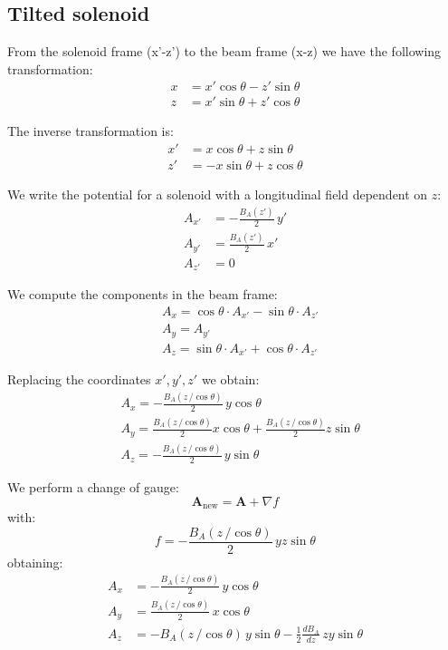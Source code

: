 \subsection{Tilted solenoid}

From the solenoid frame (x'-z') to the beam frame (x-z) we have the following transformation:
\begin{align}
x &= x' \cos\theta - z' \sin\theta \\
z &= x' \sin\theta + z' \cos\theta
\end{align}

The inverse transformation is:
\begin{align}
x' &= x \cos\theta + z \sin\theta \\
z' &= -x \sin\theta + z \cos\theta
\end{align}

We write the potential for a solenoid with a longitudinal field dependent on $z$:
\begin{align}
A_{x'} &= -\frac{B_A(z')}{2} \, y' \\
A_{y'} &= \frac{B_A(z')}{2} \, x' \\
A_{z'} &= 0
\end{align}

We compute the components in the beam frame:
\begin{align}
&A_x = \cos\theta \cdot A_{x'} - \sin\theta \cdot A_{z'} \\
&A_y = A_{y'} \\
&A_z = \sin\theta \cdot A_{x'} + \cos\theta \cdot A_{z'}
\end{align}

Replacing the coordinates $x', y', z'$ we obtain:
\begin{align}
&A_x = -\frac{B_A(z\,/\cos \theta)}{2} \, y \cos\theta \\
&A_y = \frac{B_A(z\,/\cos \theta)}{2} x \cos\theta + \frac{B_A(z\,/\cos \theta)}{2} z \sin\theta \\
&A_z = -\frac{B_A(z\,/\cos \theta)}{2} \, y \sin\theta
\end{align}

We perform a change of gauge:
\begin{equation}
\mathbf{A}_\text{new} = \mathbf{A} + \nabla f
\end{equation}
with:
\begin{equation}
f = -\frac{B_A(z\,/\cos \theta)}{2} \, y z \sin\theta
\end{equation}
obtaining:
\begin{align}
A_x &= -\frac{B_A(z\,/\cos \theta)}{2} \, y \cos\theta \\
A_y &= \frac{B_A(z\,/\cos \theta)}{2} \, x \cos\theta \\
A_z &= -B_A(z\,/\cos \theta) \, y \sin\theta - \frac{1}{2} \frac{dB_A}{dz} \, z y \sin\theta
\end{align}

